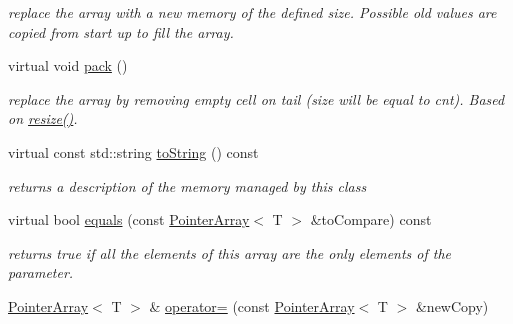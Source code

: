 \begin{DoxyCompactItemize}
\begin{DoxyCompactList}\small\item\em replace the array with a new memory of the defined size. Possible old values are copied from start up to fill the array. \end{DoxyCompactList}\item 
\hypertarget{classparray_1_1PointerArray_a13883fc7ef994a50a83ae3f9ddc4db27}{virtual void \hyperlink{classparray_1_1PointerArray_a13883fc7ef994a50a83ae3f9ddc4db27}{pack} ()}\label{classparray_1_1PointerArray_a13883fc7ef994a50a83ae3f9ddc4db27}

\begin{DoxyCompactList}\small\item\em replace the array by removing empty cell on tail (size will be equal to cnt). Based on \hyperlink{classparray_1_1PointerArray_a6d4347a899d2783d23775957ad71f743}{resize()}. \end{DoxyCompactList}\item 
\hypertarget{classparray_1_1PointerArray_a4c6e34cad01f5f72dd6c5de917ed3a34}{virtual const std\-::string \hyperlink{classparray_1_1PointerArray_a4c6e34cad01f5f72dd6c5de917ed3a34}{to\-String} () const }\label{classparray_1_1PointerArray_a4c6e34cad01f5f72dd6c5de917ed3a34}

\begin{DoxyCompactList}\small\item\em returns a description of the memory managed by this class \end{DoxyCompactList}\item 
\hypertarget{classparray_1_1PointerArray_a2ca07f329b7568d2bdd4ea50ba153a2b}{virtual bool \hyperlink{classparray_1_1PointerArray_a2ca07f329b7568d2bdd4ea50ba153a2b}{equals} (const \hyperlink{classparray_1_1PointerArray}{Pointer\-Array}$<$ T $>$ \&to\-Compare) const }\label{classparray_1_1PointerArray_a2ca07f329b7568d2bdd4ea50ba153a2b}

\begin{DoxyCompactList}\small\item\em returns true if all the elements of this array are the only elements of the parameter. \end{DoxyCompactList}\item 
\hypertarget{classparray_1_1PointerArray_acc9c164599807ed762727667f6b6bf13}{\hyperlink{classparray_1_1PointerArray}{Pointer\-Array}$<$ T $>$ \& \hyperlink{classparray_1_1PointerArray_acc9c164599807ed762727667f6b6bf13}{operator=} (const \hyperlink{classparray_1_1PointerArray}{Pointer\-Array}$<$ T $>$ \&new\-Copy)}\label{classparray_1_1PointerArray_acc9c164599807ed762727667f6b6bf13}


\end{DoxyCompactItemize}
